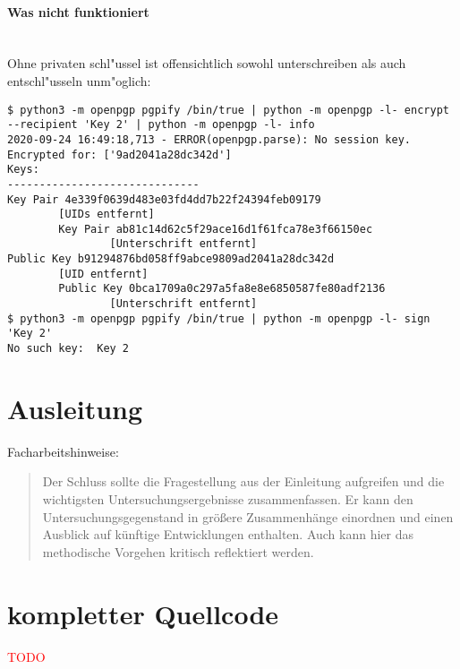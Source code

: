 \documentclass[12pt]{article}
\newcommand{\todo}[1]{\textcolor{red}{\mbox{TODO}}\marginpar{\textcolor{red}{#1}}}
\begin{document}
\paragraph{Was nicht funktioniert}~\\
Ohne privaten schl"ussel ist offensichtlich sowohl unterschreiben als auch entschl"usseln unm"oglich:
\begin{lstlisting}
$ python3 -m openpgp pgpify /bin/true | python -m openpgp -l- encrypt --recipient 'Key 2' | python -m openpgp -l- info
2020-09-24 16:49:18,713 - ERROR(openpgp.parse): No session key. Encrypted for: ['9ad2041a28dc342d']
Keys:
------------------------------
Key Pair 4e339f0639d483e03fd4dd7b22f24394feb09179
        [UIDs entfernt]
        Key Pair ab81c14d62c5f29ace16d1f61fca78e3f66150ec
                [Unterschrift entfernt]
Public Key b91294876bd058ff9abce9809ad2041a28dc342d
        [UID entfernt]
        Public Key 0bca1709a0c297a5fa8e8e6850587fe80adf2136
                [Unterschrift entfernt]
$ python3 -m openpgp pgpify /bin/true | python -m openpgp -l- sign 'Key 2'
No such key:  Key 2
\end{lstlisting}

\section{Ausleitung}
Facharbeitshinweise:
\begin{quote}
Der Schluss sollte die Fragestellung aus der Einleitung aufgreifen und die wichtigsten Untersuchungsergebnisse zusammenfassen. Er kann den Untersuchungsgegenstand in größere Zusammenhänge einordnen und einen Ausblick auf künftige Entwicklungen enthalten. Auch kann hier das methodische Vorgehen kritisch reflektiert werden.
\end{quote}

\appendix

\section{kompletter Quellcode}
\todo{sind ca. 30 Seiten}
\lstset{language=Python}
%
%
%
%
%
%
%
%
%
%
\end{document}
